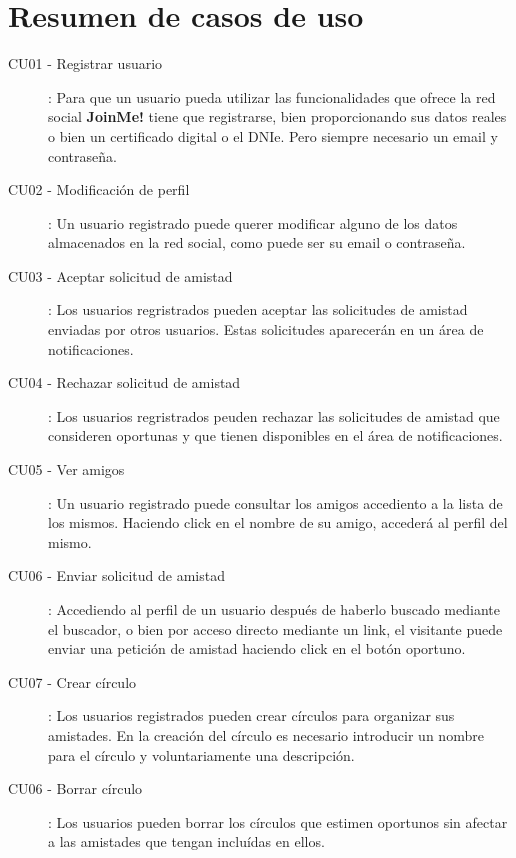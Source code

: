 \documentclass[12pt, a4paper, titlepage]{article}
\begin{document}
\section{Resumen de casos de uso}

\begin{description}
    \item [CU01 - Registrar usuario]: Para que un usuario pueda utilizar las funcionalidades que ofrece la red social \textbf{JoinMe!} tiene que registrarse, bien proporcionando sus datos reales o bien un certificado digital
o el DNIe. Pero siempre necesario un email y contraseña.
   	\item [CU02 - Modificación de perfil]: Un usuario registrado puede querer modificar alguno de los datos almacenados en la red social, como puede ser su email o contraseña.
    \item [CU03 - Aceptar solicitud de amistad]: Los usuarios regristrados pueden aceptar las solicitudes de amistad enviadas por otros usuarios. Estas solicitudes aparecerán en un área de notificaciones.
    
    \item [CU04 - Rechazar solicitud de amistad]: Los usuarios regristrados peuden rechazar las solicitudes de amistad que consideren oportunas y que tienen disponibles en el área de notificaciones.
    
    \item [CU05 - Ver amigos]: Un usuario registrado puede consultar los amigos accediento a la lista de los mismos. Haciendo click en el nombre de su amigo, accederá al perfil del mismo.
    
    \item [CU06 - Enviar solicitud de amistad]: Accediendo al perfil de un usuario después de haberlo buscado mediante el buscador, o bien por acceso directo mediante un link, el visitante puede enviar una petición de amistad haciendo click en el botón oportuno.
    
    \item [CU07 - Crear círculo]: Los usuarios registrados pueden crear círculos para organizar sus amistades. En la creación del círculo es necesario introducir un nombre para el círculo y voluntariamente una descripción.
    
    \item [CU06 - Borrar círculo]: Los usuarios pueden borrar los círculos que estimen oportunos sin afectar a las amistades que tengan incluídas en ellos.
    

\end{description}
\end{document}
